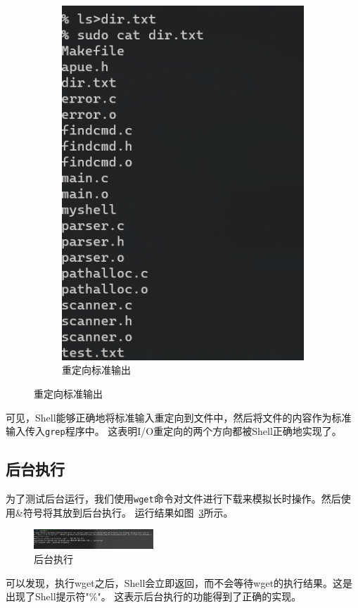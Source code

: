 \documentclass[a4paper,twoside]{article}
\begin{document}
\begin{spacing}{1.2}
\begin{figure}[htb]
\begin{subfigure}{0.4\textwidth}
		\includegraphics[width=\textwidth]{stdout.png}
		\caption{重定向标准输出}
		\label{fig:f3}
	\end{subfigure}
\end{figure}
可见，Shell能够正确地将标准输入重定向到文件中，然后将文件的内容作为标准输入传入\texttt{grep}程序中。
这表明I/O重定向的两个方向都被Shell正确地实现了。

\subsection{后台执行}

为了测试后台运行，我们使用\texttt{wget}命令对文件进行下载来模拟长时操作。然后使用\&符号将其放到后台执行。
运行结果如图~\ref{fig:background}所示。
\begin{figure}[htb]
	\centering
	\caption{后台执行}
	\label{fig:background}
	\includegraphics[width=0.4\textwidth]{back.png}
\end{figure}
可以发现，执行wget之后，Shell会立即返回，而不会等待wget的执行结果。这是出现了Shell提示符"\%"。
这表示后台执行的功能得到了正确的实现。


\end{spacing}
\end{document}
